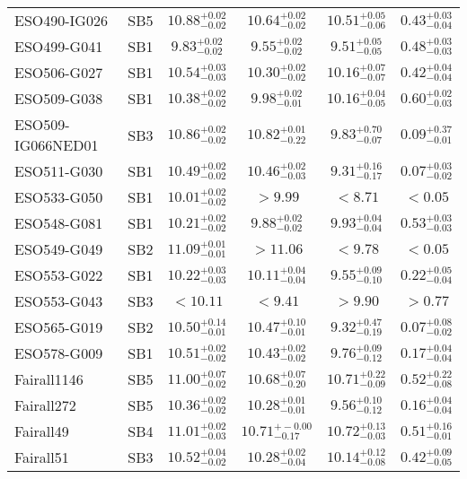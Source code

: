 \documentclass[onecolumn]{mn2e}
\begin{document}
{\begin{center}
\begin{longtable}{lccccc}
ESO490-IG026 & SB5 & $10.88_{-0.02}^{+0.02}$ & $10.64_{-0.02}^{+0.02}$ & $10.51_{-0.06}^{+0.05}$ &$0.43_{-0.04}^{+0.03}$ \\
ESO499-G041 & SB1 & $9.83_{-0.02}^{+0.02}$ & $9.55_{-0.02}^{+0.02}$ & $9.51_{-0.05}^{+0.05}$ &$0.48_{-0.03}^{+0.03}$ \\
ESO506-G027 & SB1 & $10.54_{-0.03}^{+0.03}$ & $10.30_{-0.02}^{+0.02}$ & $10.16_{-0.07}^{+0.07}$ &$0.42_{-0.04}^{+0.04}$ \\
ESO509-G038 & SB1 & $10.38_{-0.02}^{+0.02}$ & $9.98_{-0.01}^{+0.02}$ & $10.16_{-0.05}^{+0.04}$ &$0.60_{-0.03}^{+0.02}$ \\
ESO509-IG066NED01 & SB3 & $10.86_{-0.02}^{+0.02}$ & $10.82_{-0.22}^{+0.01}$ & $9.83_{-0.07}^{+0.70}$ &$0.09_{-0.01}^{+0.37}$ \\
ESO511-G030 & SB1 & $10.49_{-0.02}^{+0.02}$ & $10.46_{-0.03}^{+0.02}$ & $9.31_{-0.17}^{+0.16}$ &$0.07_{-0.02}^{+0.03}$ \\
ESO533-G050 & SB1 & $10.01_{-0.02}^{+0.02}$ & $>9.99$ & $<8.71$ &$<0.05$ \\
ESO548-G081 & SB1 & $10.21_{-0.02}^{+0.02}$ & $9.88_{-0.02}^{+0.02}$ & $9.93_{-0.04}^{+0.04}$ &$0.53_{-0.03}^{+0.03}$ \\
ESO549-G049 & SB2 & $11.09_{-0.01}^{+0.01}$ & $>11.06$ & $<9.78$ &$<0.05$ \\
ESO553-G022 & SB1 & $10.22_{-0.03}^{+0.03}$ & $10.11_{-0.04}^{+0.04}$ & $9.55_{-0.10}^{+0.09}$ &$0.22_{-0.04}^{+0.05}$ \\
ESO553-G043 & SB3 & $<10.11$ & $<9.41$ & $>9.90$ &$>0.77$ \\
ESO565-G019 & SB2 & $10.50_{-0.01}^{+0.14}$ & $10.47_{-0.01}^{+0.10}$ & $9.32_{-0.19}^{+0.47}$ &$0.07_{-0.02}^{+0.08}$ \\
ESO578-G009 & SB1 & $10.51_{-0.02}^{+0.02}$ & $10.43_{-0.02}^{+0.02}$ & $9.76_{-0.12}^{+0.09}$ &$0.17_{-0.04}^{+0.04}$ \\
Fairall1146 & SB5 & $11.00_{-0.02}^{+0.07}$ & $10.68_{-0.20}^{+0.07}$ & $10.71_{-0.09}^{+0.22}$ &$0.52_{-0.08}^{+0.22}$ \\
Fairall272 & SB5 & $10.36_{-0.02}^{+0.02}$ & $10.28_{-0.01}^{+0.01}$ & $9.56_{-0.12}^{+0.10}$ &$0.16_{-0.04}^{+0.04}$ \\
Fairall49 & SB4 & $11.01_{-0.03}^{+0.02}$ & $10.71_{-0.17}^{+-0.00}$ & $10.72_{-0.03}^{+0.13}$ &$0.51_{-0.01}^{+0.16}$ \\
Fairall51 & SB3 & $10.52_{-0.02}^{+0.04}$ & $10.28_{-0.04}^{+0.02}$ & $10.14_{-0.08}^{+0.12}$ &$0.42_{-0.05}^{+0.09}$ \\

\end{longtable}
\end{center}}
\end{document}
